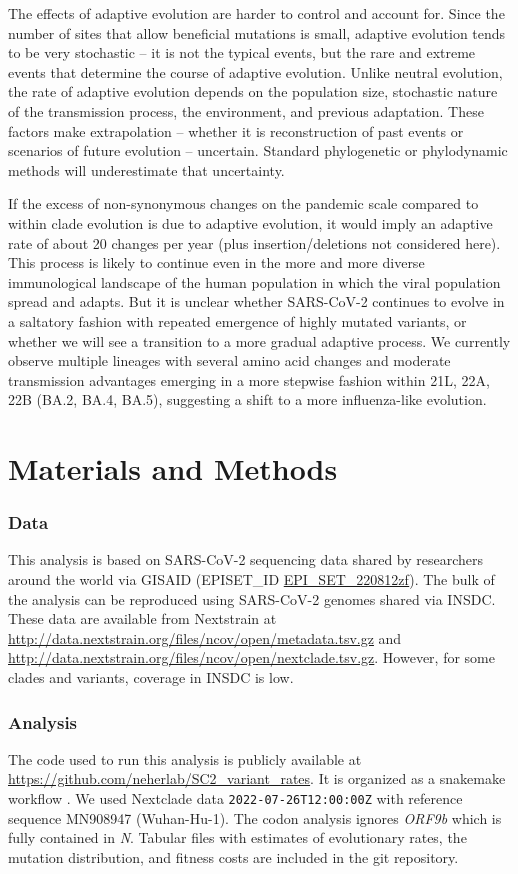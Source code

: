 \documentclass[aps,rmp, twocolumn]{revtex4}
\begin{document}
{The effects of adaptive evolution are harder to control and account for.
Since the number of sites that allow beneficial mutations is small, adaptive evolution tends to be very stochastic -- it is not the typical events, but the rare and extreme events that determine the course of adaptive evolution.
Unlike neutral evolution, the rate of adaptive evolution depends on the population size, stochastic nature of the transmission process, the environment, and previous adaptation.
These factors make extrapolation -- whether it is reconstruction of past events or scenarios of future evolution -- uncertain.
Standard phylogenetic or phylodynamic methods will underestimate that uncertainty.

If the excess of non-synonymous changes on the pandemic scale compared to within clade evolution is due to adaptive evolution, it would imply an adaptive rate of about 20 changes per year (plus insertion/deletions not considered here).
This process is likely to continue even in the more and more diverse immunological landscape of the human population in which the viral population spread and adapts.
But it is unclear whether SARS-CoV-2 continues to evolve in a saltatory fashion with repeated emergence of highly mutated variants, or whether we will see a transition to a more gradual adaptive process.
We currently observe multiple lineages with several amino acid changes and moderate transmission advantages emerging in a more stepwise fashion within 21L, 22A, 22B (BA.2, BA.4, BA.5), suggesting a shift to a more influenza-like evolution.

\section*{Materials and Methods}

\subsubsection*{Data}
This analysis is based on SARS-CoV-2 sequencing data shared by researchers around the world via GISAID \citep{shu_gisaid_2017} (EPISET\_ID \href{10.55876/gis8.220812zf}{EPI_SET_220812zf}).
The bulk of the analysis can be reproduced using SARS-CoV-2 genomes shared via INSDC.
These data are available from Nextstrain at \url{http://data.nextstrain.org/files/ncov/open/metadata.tsv.gz} and \url{http://data.nextstrain.org/files/ncov/open/nextclade.tsv.gz}.
However, for some clades and variants, coverage in INSDC is low.

\subsubsection*{Analysis}
The code used to run this analysis is publicly available at \url{https://github.com/neherlab/SC2_variant_rates}.
It is organized as a snakemake workflow \citep{koster_snakemakescalable_2012}.
We used Nextclade data \texttt{2022-07-26T12:00:00Z} with reference sequence MN908947 (Wuhan-Hu-1).
The codon analysis ignores \emph{ORF9b} which is fully contained in \emph{N}.
Tabular files with estimates of evolutionary rates, the mutation distribution, and fitness costs are included in the git repository.

}
\end{document}

